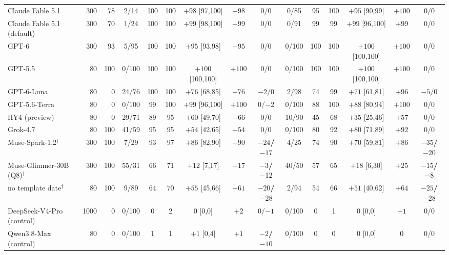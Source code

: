 \begin{tabular}{@{}l r r ccc cc c ccc cc c@{}}
Claude Fable 5.1 & 300 & 78 & 2/14 & 100 & 100 & $+98$ {\scriptsize[97,100]} & $+98$ & $0$/$0$ & 0/85 & 95 & 100 & $+95$ {\scriptsize[90,99]} & $+100$ & $0$/$0$ \\
Claude Fable 5.1 (default) & 300 & 70 & 1/24 & 100 & 100 & $+99$ {\scriptsize[98,100]} & $+99$ & $0$/$0$ & 0/91 & 99 & 99 & $+99$ {\scriptsize[96,100]} & $+99$ & $0$/$0$ \\
GPT-6 & 300 & 93 & 5/95 & 100 & 100 & $+95$ {\scriptsize[93,98]} & $+95$ & $0$/$0$ & 0/100 & 100 & 100 & $+100$ {\scriptsize[100,100]} & $+100$ & $0$/$0$ \\
GPT-5.5 & 80 & 100 & 0/100 & 100 & 100 & $+100$ {\scriptsize[100,100]} & $+100$ & $0$/$0$ & 0/100 & 100 & 100 & $+100$ {\scriptsize[100,100]} & $+100$ & $0$/$0$ \\
GPT-6-Luna & 80 & 0 & 24/76 & 100 & 100 & $+76$ {\scriptsize[68,85]} & $+76$ & $-2$/$0$ & 2/98 & 74 & 99 & $+71$ {\scriptsize[61,81]} & $+96$ & $-5$/$0$ \\
GPT-5.6-Terra & 80 & 0 & 0/100 & 99 & 100 & $+99$ {\scriptsize[96,100]} & $+100$ & $0$/$-2$ & 0/100 & 88 & 100 & $+88$ {\scriptsize[80,94]} & $+100$ & $0$/$0$ \\
HY4 (preview) & 80 & 0 & 29/71 & 89 & 95 & $+60$ {\scriptsize[49,70]} & $+66$ & $0$/$0$ & 10/90 & 45 & 68 & $+35$ {\scriptsize[25,46]} & $+57$ & $0$/$0$ \\
Grok-4.7 & 80 & 100 & 41/59 & 95 & 95 & $+54$ {\scriptsize[42,65]} & $+54$ & $0$/$0$ & 0/100 & 80 & 92 & $+80$ {\scriptsize[71,89]} & $+92$ & $0$/$0$ \\
Muse-Spark-1.2$^\ddagger$ & 300 & 100 & 7/29 & 93 & 97 & $+86$ {\scriptsize[82,90]} & $+90$ & \textbf{$-24$/$-17$} & 4/25 & 74 & 90 & $+70$ {\scriptsize[59,81]} & $+86$ & \textbf{$-35$/$-20$} \\
Muse-Glimmer-30B (Q8)$^\dagger$ & 300 & 100 & 55/31 & 66 & 71 & $+12$ {\scriptsize[7,17]} & $+17$ & \textbf{$-3$/$-12$} & 40/50 & 57 & 65 & $+18$ {\scriptsize[6,30]} & $+25$ & \textbf{$-15$/$-8$} \\
\quad no template date$^\dagger$ & 80 & 100 & 9/89 & 64 & 70 & $+55$ {\scriptsize[45,66]} & $+61$ & \textbf{$-20$/$-28$} & 2/94 & 54 & 66 & $+51$ {\scriptsize[40,62]} & $+64$ & \textbf{$-25$/$-28$} \\
DeepSeek-V4-Pro (control) & 1000 & 0 & 0/100 & 0 & 2 & $0$ {\scriptsize[0,0]} & $+2$ & $0$/$-1$ & 0/100 & 0 & 1 & $0$ {\scriptsize[0,0]} & $+1$ & $0$/$0$ \\
Qwen3.8-Max (control) & 80 & 0 & 0/100 & 1 & 1 & $+1$ {\scriptsize[0,4]} & $+1$ & \textbf{$-2$/$-10$} & 0/100 & 0 & 0 & $0$ {\scriptsize[0,0]} & $0$ & $0$/$0$ \\
\bottomrule
\end{tabular}
